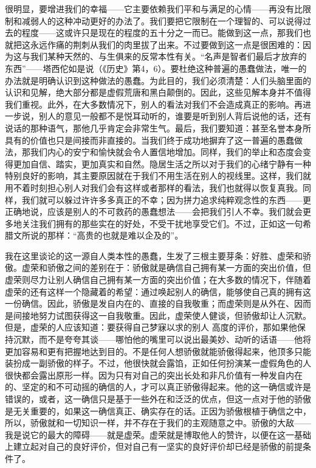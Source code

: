 \documentclass[12pt,oneside]{book}
\begin{document}
很明显，要增进我们的幸福——它主要依赖我们平和与满足的心情——再没有比限制和减弱人的这种冲动更好的办法了。我们要把它限制在一个理智的、可以说得过去的程度——这或许只是现在的程度的五十分之一而已。能做到这一点，那我们也就把这永远作痛的荆刺从我们的肉里拔了出来。不过要做到这一点是很困难的：因为这与我们某种天然的、与生俱来的反常本性有关。“名声是智者们最后才放弃的东西”——塔西佗如是说（《历史》第4，6）。要杜绝这种普遍的愚蠢做法，唯一的办法就是明确认识到这种做法的愚蠢。为此目的，我们必须清楚：人们头脑里面的认识和见解，绝大部分都是虚假荒唐和黑白颠倒的。因此，这些见解本身并不值得我们重视。此外，在大多数情况下，别人的看法对我们不会造成真正的影响。再进一步说，别人的意见一般都不是悦耳动听的，谁要是听到别人背后说他的话，还有说话的那种语气，那他几乎肯定会非常生气。最后，我们要知道：甚至名誉本身所具有的价值也只是间接而非直接的。当我们终于成功地摒弃了这一普遍的愚蠢做法，那我们内心的安宁和愉快就会令人置信地增加。同样，我们的举止和态度会变得更加自信、踏实，更加真实和自然。隐居生活之所以对于我们的心绪宁静有一种特别良好的影响，其主要原因就在于我们不用生活在别人的视线里。这样，我们就用不着时刻担心别人对我们会有这样或者那样的看法，我们也就得以恢复真我。同样，我们就可以躲过许许多多真正的不幸；因为拼力追求纯粹观念性的东西——更正确地说，应该是别人的不可救药的愚蠢想法——会把我们引人不幸。我们就会更多地关注我们拥有的那些实在的好处，不受干扰地享受它们。不过，正如这一句希腊文所说的那样：“高贵的也就是难以企及的”。 

我在这里谈论的这一源自人类本性的愚蠢，生发了三根主要芽条：好胜、虚荣和骄傲。虚荣和骄傲之间的差别在于：骄傲就是确信自己拥有某一方面的突出价值，但虚荣则尽力让别人确信自己拥有某一方面的突出价值；在大多数的情况下，伴随着虚荣的还有这样一个隐藏着的希望：通过唤起别人的确信，能够使自己真的拥有这一份确信。因此，骄傲是发自内在的、直接的自我敬重；而虚荣则是从外在、因而是间接地努力试图获得这一自我敬重。因此，虚荣使人健谈，但骄傲却让人沉默。但是，虚荣的人应该知道：要获得自己梦寐以求的别人
高度的评价，那如果他保持沉默，而不是夸夸其谈——哪怕他的嘴里可以说出最美妙、动听的话语——他将更加容易和更有把握地达到目的。不是任何人想骄傲就能骄傲得起来，他顶多只能装扮成一副骄傲的样子。不过，他很快就会露馅，正如任何扮演某一虚假角色的人很快都会露出原形一样。因为只有对自己的突出长处和非凡价值有一种发自内在的、坚定的和不可动摇的确信的人，才可以真正骄傲得起来。他的这一确信或许是错误的，或者，这一确信只是基于一些外在和泛泛的优点，但这一点对于他的骄傲是无关重要的，如果这一确信真正、确实存在的话。正因为骄傲根植于确信之中，所以，骄傲就和一切知识一样，并不存在于我们的主观随意之中。骄傲的大敌——我是说它的最大的障碍——就是虚荣。虚荣就是博取他人的赞许，以便在这一基础上建立起对自己的良好评价，但对自己有一坚实的良好评价却已经是骄傲的前提条件了。 
\end{document}
